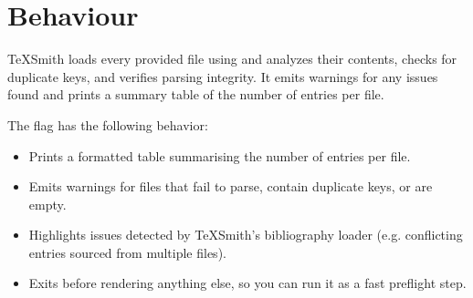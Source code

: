 \documentclass[a4paper,twoside]{article}
\begin{document}
\section{Behaviour}
TeXSmith loads every provided  file using  and analyzes their contents, checks for duplicate keys, and verifies parsing integrity. It emits warnings for any issues found and prints a summary table of the number of entries per file.

The  flag has the following behavior:
\begin{itemize}
\item Prints a formatted table summarising the number of entries per file.
\item Emits warnings for files that fail to parse, contain duplicate keys, or are empty.
\item Highlights issues detected by TeXSmith's bibliography loader (e.g. conflicting entries sourced from multiple files).
\item Exits before rendering anything else, so you can run it as a fast preflight step.
\end{itemize}
\end{document}
